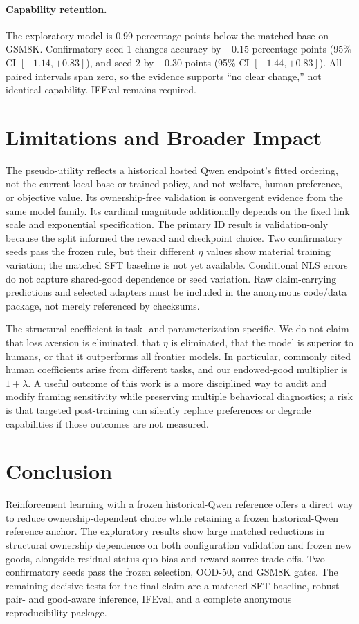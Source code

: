 \documentclass[letterpaper]{article} %
\begin{document}
\paragraph{Capability retention.}
The exploratory model is 0.99 percentage points below the matched base on
GSM8K. Confirmatory seed 1 changes accuracy by $-0.15$ percentage points
(95\% CI $[-1.14,+0.83]$), and seed 2 by $-0.30$ points
(95\% CI $[-1.44,+0.83]$). All paired intervals span zero, so the evidence
supports ``no clear change,'' not identical capability. IFEval remains required.

\section{Limitations and Broader Impact}

The pseudo-utility reflects a historical hosted Qwen endpoint's fitted ordering,
not the current local base or trained policy, and not welfare, human preference,
or objective value. Its ownership-free
validation is convergent evidence from the same model family. Its cardinal
magnitude additionally depends on the fixed link scale and exponential
specification. The primary ID
result is validation-only because the split informed the reward and checkpoint
choice. Two confirmatory seeds pass the frozen rule, but their different
$\eta$ values show material training variation; the matched SFT baseline is
not yet available. Conditional NLS errors do not capture shared-good dependence or
seed variation. Raw claim-carrying predictions and selected adapters must be
included in the anonymous code/data package, not merely referenced by
checksums.

The structural coefficient is task- and parameterization-specific. We do not
claim that loss aversion is eliminated, that $\eta$ is eliminated, that the
model is superior to humans, or that it outperforms all frontier models. In
particular, commonly cited human coefficients arise from different tasks, and
our endowed-good multiplier is $1+\lambda$. A useful outcome of this work is a
more disciplined way to audit and modify framing sensitivity while preserving
multiple behavioral diagnostics; a risk is that targeted post-training can
silently replace preferences or degrade capabilities if those outcomes are not
measured.

\section{Conclusion}

Reinforcement learning with a frozen historical-Qwen reference offers a direct way to reduce
ownership-dependent choice while retaining a frozen historical-Qwen reference
anchor. The exploratory results show large matched reductions in
structural ownership dependence on both configuration validation and frozen
new goods, alongside residual status-quo bias and reward-source trade-offs.
Two confirmatory seeds pass the frozen selection, OOD-50, and GSM8K gates.
The remaining decisive tests for the final claim are a matched SFT baseline,
robust pair- and good-aware inference, IFEval, and a complete
anonymous reproducibility package.


\end{document}
